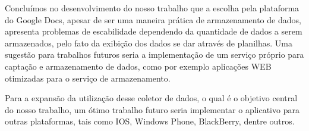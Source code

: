 \documentclass[12pt, %
openright, 
oneside, %
a4paper,    %
brazil]{facom-ufu-abntex2}
\begin{document}
Concluímos no desenvolvimento do nosso trabalho que a escolha pela plataforma do Google Docs, apesar de ser uma maneira prática de armazenamento de dados, apresenta problemas de escabilidade dependendo da quantidade de dados a serem armazenados, pelo fato da exibição dos dados se dar através de planilhas. Uma sugestão para trabalhos futuros seria a implementação de um serviço próprio para captação e armazenamento de dados, como por exemplo aplicações WEB otimizadas para o serviço de armazenamento.

Para a expansão da utilização desse coletor de dados, o qual é o objetivo central do nosso trabalho, um ótimo trabalho futuro seria implementar o aplicativo para outras plataformas, tais como IOS, Windows Phone, BlackBerry, dentre outros.









\postextual









\end{document}
